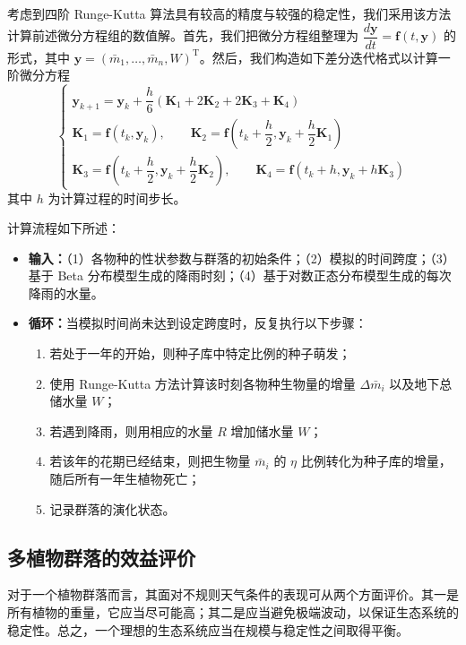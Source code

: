 \documentclass[11pt,a4paper]{ctexart}
\begin{document}
考虑到四阶 Runge-Kutta 算法具有较高的精度与较强的稳定性，我们采用该方法计算前述微分方程组的数值解。首先，我们把微分方程组整理为 $\dfrac{d\mathbf{y}}{dt}=\mathbf{f}(t,\mathbf{y})$ 的形式，其中 $\mathbf{y}=\left(\bar m_1,\dots,\bar m_n,W\right)^{\mathrm{T}}$。然后，我们构造如下差分迭代格式以计算一阶微分方程
\[
\begin{cases}
\mathbf{y}_{k+1}=\mathbf{y}_k+\dfrac{h}{6}\left(\mathbf{K}_1+2\mathbf{K}_2+2\mathbf{K}_3+\mathbf{K}_4\right)\\[0.8em]
\mathbf{K}_1=\mathbf{f}\left(t_k,\mathbf{y}_k\right),\qquad
\mathbf{K}_2=\mathbf{f}\left(t_k+\dfrac{h}{2},\mathbf{y}_k+\dfrac{h}{2}\mathbf{K}_1\right)\\[0.8em]
\mathbf{K}_3=\mathbf{f}\left(t_k+\dfrac{h}{2},\mathbf{y}_k+\dfrac{h}{2}\mathbf{K}_2\right),\qquad
\mathbf{K}_4=\mathbf{f}\left(t_k+h,\mathbf{y}_k+h\mathbf{K}_3\right)
\end{cases}
\]
其中 $h$ 为计算过程的时间步长。

计算流程如下所述：

\begin{itemize}
\item \textbf{输入：}（1）各物种的性状参数与群落的初始条件；（2）模拟的时间跨度；（3）基于 Beta 分布模型生成的降雨时刻；（4）基于对数正态分布模型生成的每次降雨的水量。
\item \textbf{循环：}当模拟时间尚未达到设定跨度时，反复执行以下步骤：
\begin{enumerate}
\item 若处于一年的开始，则种子库中特定比例的种子萌发；
\item 使用 Runge-Kutta 方法计算该时刻各物种生物量的增量 $\Delta \bar m_i$ 以及地下总储水量 $W$；
\item 若遇到降雨，则用相应的水量 $R$ 增加储水量 $W$；
\item 若该年的花期已经结束，则把生物量 $\bar m_i$ 的 $\eta$ 比例转化为种子库的增量，随后所有一年生植物死亡；
\item 记录群落的演化状态。
\end{enumerate}
\end{itemize}

\subsection{多植物群落的效益评价}

对于一个植物群落而言，其面对不规则天气条件的表现可从两个方面评价。其一是所有植物的重量，它应当尽可能高；其二是应当避免极端波动，以保证生态系统的稳定性。总之，一个理想的生态系统应当在规模与稳定性之间取得平衡。
\end{document}
